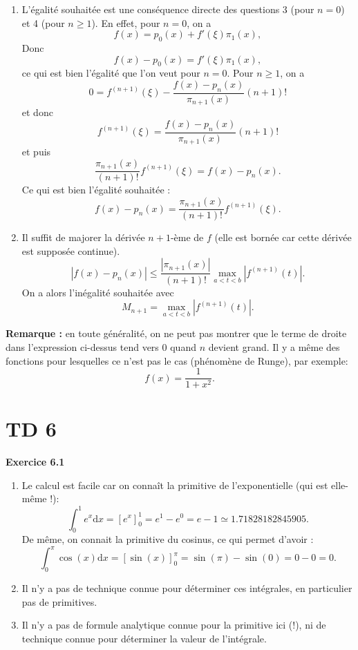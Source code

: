 \documentclass{article}
\begin{document}
\begin{enumerate}
\begin{enumerate}
    \end{enumerate}
    
    \item L'égalité souhaitée est une conséquence directe des questions 3 (pour $n=0$) et 4 (pour $n\geq1$).
    En effet, pour $n=0$, on a 
    \[
    f(x) = p_0(x) + f'(\xi) \pi_1(x),
    \]
    Donc
    \[
    f(x) - p_0(x) = f'(\xi) \pi_1(x),
    \]
    ce qui est bien l'égalité que l'on veut pour $n=0$.
    Pour $n \geq 1$, on a
    \[
        0 = 
         f^{(n+1)}(\xi) - \frac{f(x)-p_n(x)}{\pi_{n+1}(x)} (n+1) !
    \]
    et donc
    \[
         f^{(n+1)}(\xi) = \frac{f(x)-p_n(x)}{\pi_{n+1}(x)} (n+1) !
    \]
    et puis
    \[
         \frac{\pi_{n+1}(x)}{(n+1) !}
         f^{(n+1)}(\xi) = f(x)-p_n(x).
    \]
    Ce qui est bien l'égalité souhaitée :
    \[
         f(x)-p_n(x) = \frac{\pi_{n+1}(x)}{(n+1) !}
         f^{(n+1)}(\xi).
    \]
    
    \item Il suffit de majorer la dérivée $n+1$-ème de $f$ (elle est bornée car cette dérivée est supposée continue). 
    \[
         |f(x)-p_n(x)| \leq \frac{|\pi_{n+1}(x)|}{(n+1) !}
         \max_{a< t <b} |f^{(n+1)} (t)|.
    \]
        On a alors l'inégalité souhaitée avec
    \[
    M_{n+1} = \max_{a< t <b} |f^{(n+1)} (t)|.
    \]
\end{enumerate}

{\bf Remarque :} en toute généralité, on ne peut pas montrer que le terme de droite dans l'expression ci-dessus tend vers $0$ quand $n$ devient grand. Il y a même des fonctions pour lesquelles ce n'est pas le cas (phénomène de Runge), par exemple:
\[
f(x) = \frac{1}{1+x^2}.
\]

\newpage

\section{TD 6}

{\bf Exercice 6.1}

\begin{enumerate}
    \item Le calcul est facile car on connaît la primitive de l'exponentielle (qui est elle-même !):
    \[
    \int_0^1 e^x \mathrm{d}x = [ e^x ]_0^1 = e^1 - e^0 
    = e - 1 \simeq 1.71828182845905.
    \]
    De même, on connait la primitive du cosinus, ce qui permet d'avoir :
    \[
    \int_0^\pi \cos(x) \mathrm{d}x = \left [ \sin(x) \right ]_0^\pi = \sin(\pi) - \sin(0) = 0 - 0 = 0. 
    \]
    
    \item Il n'y a pas de technique connue pour déterminer ces intégrales, en particulier pas de primitives.
    
    \item Il n'y a pas de formule analytique connue pour la primitive ici (!), ni de technique connue pour déterminer la valeur de l'intégrale.
    
\end{enumerate}
\end{document}
